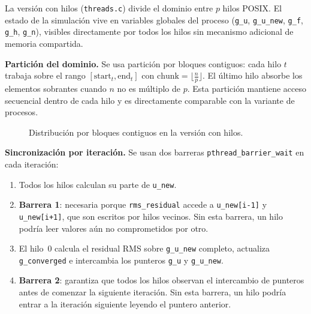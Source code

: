La versión con hilos (\texttt{threads.c}) divide el dominio entre $p$ hilos POSIX. El estado de la simulación vive en variables globales del proceso (\texttt{g\_u}, \texttt{g\_u\_new}, \texttt{g\_f}, \texttt{g\_h}, \texttt{g\_n}), visibles directamente por todos los hilos sin mecanismo adicional de memoria compartida.

\textbf{Partición del dominio.} Se usa partición por bloques contiguos: cada hilo $t$ trabaja sobre el rango $[\text{start}_t, \text{end}_t]$ con $\text{chunk} = \lfloor \frac{n}{p} \rfloor$. El último hilo absorbe los elementos sobrantes cuando $n$ no es múltiplo de $p$. Esta partición mantiene acceso secuencial dentro de cada hilo y es directamente comparable con la variante de procesos.

\begin{figure}[H]
\centering
{}
\caption{Distribución por bloques contiguos en la versión con hilos.}
\label{fig:particion_hilos}
\end{figure}

\textbf{Sincronización por iteración.} Se usan dos barreras \texttt{pthread\_barrier\_wait} en cada iteración:

\begin{enumerate}
    \item Todos los hilos calculan su parte de \texttt{u\_new}.
    \item \textbf{Barrera 1}: necesaria porque \texttt{rms\_residual} accede a \texttt{u\_new[i-1]} y \texttt{u\_new[i+1]}, que son escritos por hilos vecinos. Sin esta barrera, un hilo podría leer valores aún no comprometidos por otro.
    \item El hilo~0 calcula el residual RMS sobre \texttt{g\_u\_new} completo, actualiza \texttt{g\_converged} e intercambia los punteros \texttt{g\_u} y \texttt{g\_u\_new}.
    \item \textbf{Barrera 2}: garantiza que todos los hilos observan el intercambio de punteros antes de comenzar la siguiente iteración. Sin esta barrera, un hilo podría entrar a la iteración siguiente leyendo el puntero anterior.
\end{enumerate}

